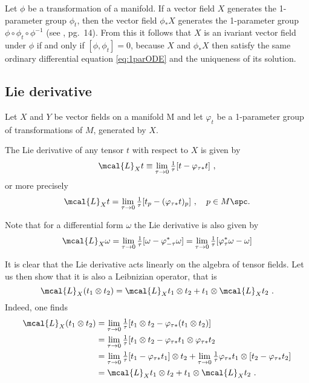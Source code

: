 \documentclass[10pt,reqno]{amsart}
\numberwithin{equation}{section}
\begin{document}
Let $\phi$ be a transformation of a manifold. If a vector field 
$X$ generates the 1-parameter group $\phi_t$, then the vector 
field $\phi_\ast X$ generates the 1-parameter group $\phi\circ 
\phi_t\circ \phi^{-1}$ (see \cite{kob1996found}, pg.\ 14). From 
this it follows that $X$ is an ivariant vector field under $\phi$ 
if and only if $[\phi, \phi_t] = 0$, because $X$ and $\phi_\ast 
X$ then satisfy the same ordinary differential equation 
\eqref{eq:1parODE} and the uniqueness of its solution.

\subsection{Lie derivative}

Let $X$ and $Y$ be vector fields on a manifold M and let 
$\varphi_t$ be a 1-parameter group of transformations of $M$, 
generated by $X$.
%
\begin{definition}
	The Lie derivative of any tensor $t$ with respect to $X$ is 
	given by
	\begin{equation}
		\mcal{L}_X t \equiv \lim_{\tau\to 0} \tfrac{1}{\tau} [t - 
		\varphi_{\tau\ast} t]~,
	\end{equation}
	or more precisely
	\begin{displaymath}
		\mcal{L}_X t = \lim_{\tau\to 0} \tfrac{1}{\tau} [t_p - 
		(\varphi_{\tau\ast} t)_p]~, \quad p \in M\spc.
	\end{displaymath}
\end{definition}

Note that for a differential form $\omega$ the Lie derivative is 
also given by
%
\begin{equation}
	\mcal{L}_X \omega = \lim_{\tau\to 0} \tfrac{1}{\tau} [\omega - 
	\varphi^\ast_{-\tau}\omega] = \lim_{\tau\to 0} \tfrac{1}{\tau} 
	[\varphi^\ast_\tau \omega - \omega]
\end{equation}

It is clear that the Lie derivative acts linearly on the algebra 
of tensor fields. Let us then show that it is also a Leibnizian 
operator, that is
%
\begin{equation}
	\mcal{L}_X(t_1 \otimes t_2) = \mcal{L}_X t_1 \otimes t_2 + t_1 
	\otimes \mcal{L}_X t_2~.
\end{equation}
Indeed, one finds
%
\begin{align*}
	\mcal{L}_X(t_1 \otimes t_2)
	&= \lim_{\tau \to 0} \tfrac{1}{\tau} [t_1 \otimes t_2 - 
	\varphi_{\tau\ast}(t_1 \otimes t_2)] \\
	&= \lim_{\tau \to 0} \tfrac{1}{\tau} [t_1 \otimes t_2 - 
	\varphi_{\tau\ast}t_1 \otimes \varphi_{\tau\ast}t_2 \\
	&= \lim_{\tau \to 0} \tfrac{1}{\tau} [t_1 - 
	\varphi_{\tau\ast}t_1] \otimes t_2 + \lim_{\tau \to 0} 
	\tfrac{1}{\tau} \varphi_{\tau\ast} t_1 \otimes [t_2 - 
	\varphi_{\tau\ast} t_2] \\
	&= \mcal{L}_X t_1 \otimes t_2 + t_1 \otimes \mcal{L}_X t_2~.
\end{align*}
\end{document}
